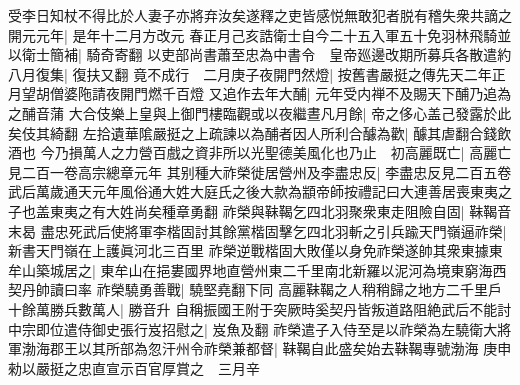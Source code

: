 受李日知杖不得比於人妻子亦將弃汝矣遂釋之吏皆感悦無敢犯者脱有稽失衆共謫之開元元年|{
	是年十二月方改元}
春正月己亥誥衛士自今二十五入軍五十免羽林飛騎並以衛士簡補|{
	騎奇寄翻}
以吏部尚書蕭至忠為中書令　皇帝廵邊改期所募兵各散遣約八月復集|{
	復扶又翻}
竟不成行　二月庚子夜開門然燈|{
	按舊書嚴挺之傳先天二年正月望胡僧婆陁請夜開門燃千百燈}
又追作去年大酺|{
	元年受内禅不及賜天下酺乃追為之酺音蒲}
大合伎樂上皇與上御門樓臨觀或以夜繼晝凡月餘|{
	帝之侈心盖己發露於此矣伎其綺翻}
左拾遺華隂嚴挺之上疏諫以為酺者因人所利合醵為歡|{
	醵其虐翻合錢飲酒也}
今乃損萬人之力營百戲之資非所以光聖德美風化也乃止　初高麗既亡|{
	高麗亡見二百一卷高宗總章元年}
其别種大祚榮徙居營州及李盡忠反|{
	李盡忠反見二百五卷武后萬歲通天元年風俗通大姓大庭氏之後大款為顓帝師按禮記曰大連善居喪東夷之子也盖東夷之有大姓尚矣種章勇翻}
祚榮與靺鞨乞四北羽聚衆東走阻險自固|{
	靺鞨音末曷}
盡忠死武后使將軍李楷固討其餘黨楷固擊乞四北羽斬之引兵踰天門嶺逼祚榮|{
	新書天門嶺在上護眞河北三百里}
祚榮逆戰楷固大敗僅以身免祚榮遂帥其衆東據東牟山築城居之|{
	東牟山在挹婁國界地直營州東二千里南北新羅以泥河為境東窮海西契丹帥讀曰率}
祚榮驍勇善戰|{
	驍堅堯翻下同}
高麗靺鞨之人稍稍歸之地方二千里戶十餘萬勝兵數萬人|{
	勝音升}
自稱振國王附于突厥時奚契丹皆叛道路阻絶武后不能討中宗即位遣侍御史張行岌招慰之|{
	岌魚及翻}
祚榮遣子入侍至是以祚榮為左驍衛大將軍渤海郡王以其所部為忽汗州令祚榮兼都督|{
	靺鞨自此盛矣始去靺鞨專號渤海}
庚申勑以嚴挺之忠直宣示百官厚賞之　三月辛

